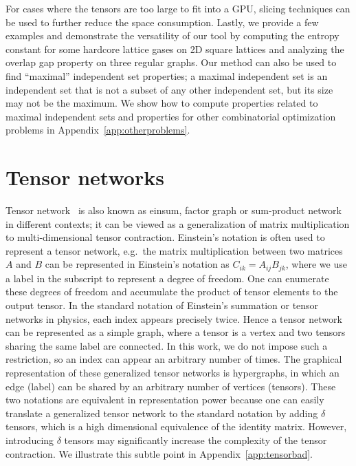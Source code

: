\documentclass[onefignum, onetabnum]{siamart190516}
\newcommand{\<}{\langle}
\renewcommand{\>}{\rangle}
\newcommand{\App}[1]{Appendix~\ref{#1}}
\newcounter{example}
\begin{document}
For cases where the tensors are too large to fit into a GPU, slicing techniques can be used to further reduce the space consumption.
Lastly, we provide a few examples and demonstrate the versatility of our tool by computing the entropy constant for some hardcore lattice gases on 2D square lattices and analyzing the overlap gap property on three regular graphs.
Our method can also be used to find ``maximal'' independent set properties; 
a maximal independent set is an independent set that is not a subset of any other independent set, but its size may not be the maximum. 
We show how to compute properties related to maximal independent sets and properties for other combinatorial optimization problems in \App{app:otherproblems}.

\section{Tensor networks}
Tensor network~\cite{Cirac2020, Orus2014} is also known as einsum, factor graph or sum-product network~\cite{Bishop2006} in different contexts;
it can be viewed as a generalization of matrix multiplication to multi-dimensional tensor contraction.
Einstein's notation is often used to represent a tensor network, e.g.\ the matrix multiplication between two matrices $A$ and $B$ can be represented in Einstein's notation as $C_{ik} = A_{ij}B_{jk}$,
where we use a label in the subscript to represent a degree of freedom.
One can enumerate these degrees of freedom and accumulate the product of tensor elements to the output tensor.
In the standard notation of Einstein's summation or tensor networks in physics, each index appears precisely twice.
Hence a tensor network can be represented as a simple graph,
where a tensor is a vertex and two tensors sharing the same label are connected.
In this work, we do not impose such a restriction, so an index can appear an arbitrary number of times. 
The graphical representation of these generalized tensor networks is hypergraphs, in which an edge (label) can be shared by an arbitrary number of vertices (tensors).
These two notations are equivalent in representation power because one can easily translate a generalized tensor network to the standard notation by adding $\delta$ tensors, which is a high dimensional equivalence of the identity matrix.
However, introducing $\delta$ tensors may significantly increase the complexity of the tensor contraction. We illustrate this subtle point in \App{app:tensorbad}.
\end{document}
